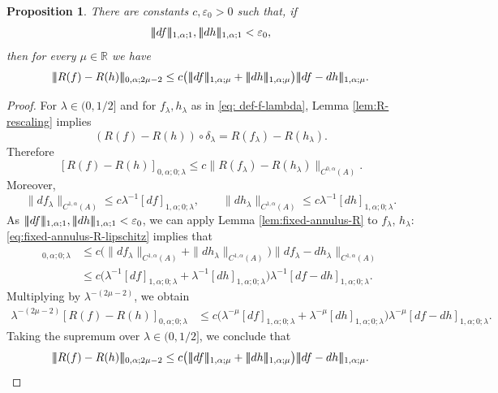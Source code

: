 \documentclass[11pt]{amsart}
\DeclarePairedDelimiter{\tnorm}{\vert\!\vert\!\vert}{\vert\!\vert\!\vert}
\newtheorem{proposition}{Proposition}
\theoremstyle{definition}
\theoremstyle{remark}
\begin{document}
\begin{proposition}\label{prop: contraction-estimate}
There are constants \(c,\varepsilon_0>0\) such that, if
\[
    \tnorm{df}_{1,\alpha;1},
    \tnorm{dh}_{1,\alpha;1}
    <
    \varepsilon_0,
\]
then for every \(\mu\in\mathbb R\) we have
\[
    \tnorm{R(f)-R(h)}_{0,\alpha;2\mu-2}
    \le
    c\big(
        \tnorm{df}_{1,\alpha;\mu}
        +
        \tnorm{dh}_{1,\alpha;\mu}
    \big)
    \tnorm{df-dh}_{1,\alpha;\mu}.
\]
\end{proposition}
\begin{proof}
For \(\lambda\in(0,1/2]\) and for $f_\lambda, h_\lambda$ as in \eqref{eq: def-f-lambda}, Lemma \ref{lem:R-rescaling} implies
\[
    (R(f)-R(h))\circ\delta_\lambda
    =
    R(f_\lambda)-R(h_\lambda).
\]
Therefore
\[
    [R(f)-R(h)]_{0,\alpha;0;\lambda}
    \le
    c\|R(f_\lambda)-R(h_\lambda)\|_{C^{0,\alpha}(A)}.
\]
Moreover,
\[
    \|df_\lambda\|_{C^{1,\alpha}(A)}
    \le
    c\lambda^{-1}[df]_{1,\alpha; 0;\lambda},
    \qquad
    \|dh_\lambda\|_{C^{1,\alpha}(A)}
    \le
    c\lambda^{-1}[dh]_{1,\alpha;0;\lambda}.
\]
As $\tnorm{df}_{1,\alpha;1},
    \tnorm{dh}_{1,\alpha;1}
    <
    \varepsilon_0$,
we can apply Lemma \ref{lem:fixed-annulus-R} to $f_\lambda$, $h_\lambda$: \eqref{eq:fixed-annulus-R-lipschitz} implies that
\begin{align*}
    [R(f)-R(h)]_{0,\alpha;0;\lambda}
    &\le
    c\bigl(
        \|df_\lambda\|_{C^{1,\alpha}(A)}
        +
        \|dh_\lambda\|_{C^{1,\alpha}(A)}
    \bigr)
    \|df_\lambda-dh_\lambda\|_{C^{1,\alpha}(A)} \\
    &\le
    c\bigl(
        \lambda^{-1}[df]_{1,\alpha;0;\lambda}
        +
        \lambda^{-1}[dh]_{1,\alpha;0;\lambda}
    \bigr)
    \lambda^{-1}[df-dh]_{1,\alpha;0;\lambda}.
\end{align*}
Multiplying by \(\lambda^{-(2\mu-2)}\), we obtain
\[
\begin{aligned}
    \lambda^{-(2\mu-2)}
    [R(f)-R(h)]_{0,\alpha;0;\lambda}
    &\le
    c\bigl(
        \lambda^{-\mu}[df]_{1,\alpha;0;\lambda}
        +
        \lambda^{-\mu}[dh]_{1,\alpha;0;\lambda}
    \bigr)
    \lambda^{-\mu}[df-dh]_{1,\alpha;0;\lambda}.
\end{aligned}
\]
Taking the supremum over \(\lambda\in(0,1/2]\), we conclude that
\[
    \tnorm{R(f)-R(h)}_{0,\alpha;2\mu-2}
    \le
    c\big(
        \tnorm{df}_{1,\alpha;\mu}
        +
        \tnorm{dh}_{1,\alpha;\mu}
    \big)
    \tnorm{df-dh}_{1,\alpha;\mu}.
\]
\end{proof}
\end{document}
